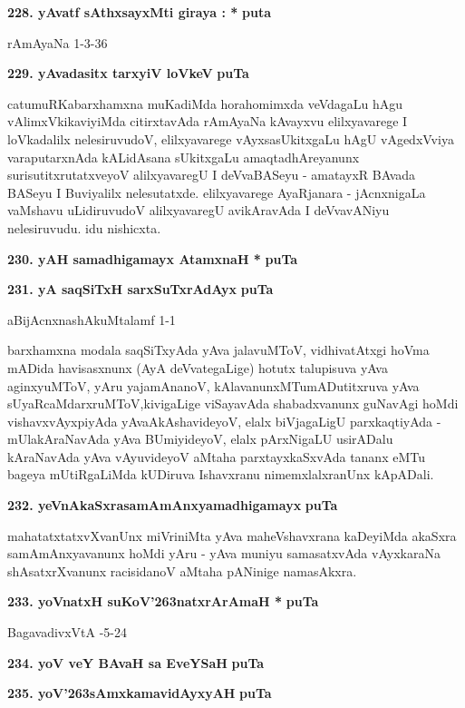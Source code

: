 \medskip
\noindent
\textbf{228. yAvatf sAthxsayxMti giraya : *} \hfill{\bf puta \pageref{77}}

\hfill{rAmAyaNa 1-3-36}

\medskip
\noindent
\textbf{229. yAvadasitx tarxyiV loVkeV} \hfill{\bf puTa \pageref{20c}}

\smallskip
catumuRKabarxhamxna muKadiMda horahomimxda veVdagaLu hAgu vAlimxVki\-kaviyiMda citirxtavAda rAmAyaNa kAvayxvu elilxyavarege I loVkadalilx nelesiruvudoV, elilxyavarege vAyxsasUkitxgaLu hAgU vAgedxVviya varaputarxnAda kALidAsana sUkitxgaLu amaqtadhAreyanunx surisutitxrutatxveyoV alilxyava\-regU I deVvaBASeyu - amatayxR BAvada BASeyu I Buviyalilx nelesutatxde. elilxyavarege AyaR\-janara - jAcnxnigaLa vaMshavu uLidiruvudoV alilxyavaregU avikAravAda I deVvavANiyu nelesiruvudu. idu nishicxta.

\medskip
\noindent
\textbf{230. yAH samadhigamayx AtamxnaH *} \hfill{\bf puTa \pageref{94}}

\medskip
\noindent
\textbf{231. yA saqSiTxH sarxSuTxrAdAyx} \hfill{\bf puTa \pageref{243}}

\hfill{aBijAcnxnashAkuMtalamf 1-1}

\smallskip
barxhamxna modala saqSiTxyAda yAva jalavuMToV, vidhivatAtxgi hoVma \hbox{mADida} havisasxnunx (AyA deVvategaLige) hotutx talupisuva yAva aginxyuMToV, yAru yajamAnanoV, kAlavanunxMTu\-mADutitxruva yAva sUyaRcaMdarxruMToV,\break kivigaLige viSayavAda shabadxvanunx guNavAgi hoMdi vishavxvAyxpiyAda yAva\break AkAshavideyoV, elalx biVjagaLigU parxkaqtiyAda - mUlakAraNavAda yAva BUmiyideyoV, elalx pArxNigaLU usirADalu kAraNavAda yAva vAyu\-videyoV aMtaha parxtayxkaSx\-vAda tananx eMTu bageya mUtiRgaLiMda kUDiruva Ishavxranu nimemxlalxranUnx kApADali.

\medskip
\noindent
\textbf{232. yeVnAkaSxrasamAmAnxyamadhigamayx} \hfill{\bf puTa \pageref{157}}

\smallskip
mahatatxtatxvXvanUnx miVriniMta yAva maheVshavxrana kaDeyiMda akaSxra samA\-mAnxyavanunx hoMdi yAru - yAva muniyu samasatxvAda vAyxkaraNa shAsatxrX\-vanunx racisidanoV aMtaha pANinige namasAkxra.

\medskip
\noindent
\textbf{233. yoVnatxH suKoV\char'263natxrArAmaH *} \hfill{\bf puTa \pageref{134}}

\hfill{BagavadivxVtA -5-24}

\medskip
\noindent
\textbf{234. yoV veY BAvaH sa EveYSaH} \hfill{\bf puTa \pageref{227}}

\medskip
\noindent
\textbf{235. yoV\char'263sAmxkamavidAyxyAH} \hfill{\bf puTa \pageref{103}}

